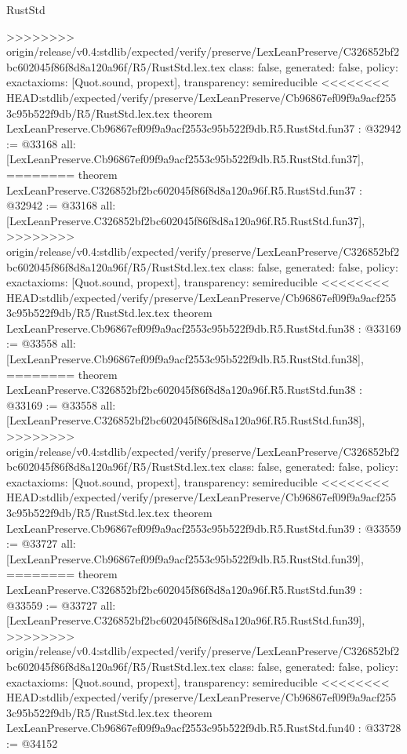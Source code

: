 \begin{lexlean}{RustStd}
\begin{coremodule}
{\begin{coremodule}
{{{{{{{{{{{{{{{{{{{{{{{{{{{{{{{{{{{{{{{{>>>>>>>> origin/release/v0.4:stdlib/expected/verify/preserve/LexLeanPreserve/C326852bf2bc602045f86f8d8a120a96f/R5/RustStd.lex.tex
  class: false,
  generated: false,
  policy: exact{axioms: [Quot.sound, propext]},
  transparency: semireducible
}
<<<<<<<< HEAD:stdlib/expected/verify/preserve/LexLeanPreserve/Cb96867ef09f9a9acf2553c95b522f9db/R5/RustStd.lex.tex
theorem LexLeanPreserve.Cb96867ef09f9a9acf2553c95b522f9db.R5.RustStd.fun37 : @32942 := @33168 {
  all: [LexLeanPreserve.Cb96867ef09f9a9acf2553c95b522f9db.R5.RustStd.fun37],
========
theorem LexLeanPreserve.C326852bf2bc602045f86f8d8a120a96f.R5.RustStd.fun37 : @32942 := @33168 {
  all: [LexLeanPreserve.C326852bf2bc602045f86f8d8a120a96f.R5.RustStd.fun37],
>>>>>>>> origin/release/v0.4:stdlib/expected/verify/preserve/LexLeanPreserve/C326852bf2bc602045f86f8d8a120a96f/R5/RustStd.lex.tex
  class: false,
  generated: false,
  policy: exact{axioms: [Quot.sound, propext]},
  transparency: semireducible
}
<<<<<<<< HEAD:stdlib/expected/verify/preserve/LexLeanPreserve/Cb96867ef09f9a9acf2553c95b522f9db/R5/RustStd.lex.tex
theorem LexLeanPreserve.Cb96867ef09f9a9acf2553c95b522f9db.R5.RustStd.fun38 : @33169 := @33558 {
  all: [LexLeanPreserve.Cb96867ef09f9a9acf2553c95b522f9db.R5.RustStd.fun38],
========
theorem LexLeanPreserve.C326852bf2bc602045f86f8d8a120a96f.R5.RustStd.fun38 : @33169 := @33558 {
  all: [LexLeanPreserve.C326852bf2bc602045f86f8d8a120a96f.R5.RustStd.fun38],
>>>>>>>> origin/release/v0.4:stdlib/expected/verify/preserve/LexLeanPreserve/C326852bf2bc602045f86f8d8a120a96f/R5/RustStd.lex.tex
  class: false,
  generated: false,
  policy: exact{axioms: [Quot.sound, propext]},
  transparency: semireducible
}
<<<<<<<< HEAD:stdlib/expected/verify/preserve/LexLeanPreserve/Cb96867ef09f9a9acf2553c95b522f9db/R5/RustStd.lex.tex
theorem LexLeanPreserve.Cb96867ef09f9a9acf2553c95b522f9db.R5.RustStd.fun39 : @33559 := @33727 {
  all: [LexLeanPreserve.Cb96867ef09f9a9acf2553c95b522f9db.R5.RustStd.fun39],
========
theorem LexLeanPreserve.C326852bf2bc602045f86f8d8a120a96f.R5.RustStd.fun39 : @33559 := @33727 {
  all: [LexLeanPreserve.C326852bf2bc602045f86f8d8a120a96f.R5.RustStd.fun39],
>>>>>>>> origin/release/v0.4:stdlib/expected/verify/preserve/LexLeanPreserve/C326852bf2bc602045f86f8d8a120a96f/R5/RustStd.lex.tex
  class: false,
  generated: false,
  policy: exact{axioms: [Quot.sound, propext]},
  transparency: semireducible
}
<<<<<<<< HEAD:stdlib/expected/verify/preserve/LexLeanPreserve/Cb96867ef09f9a9acf2553c95b522f9db/R5/RustStd.lex.tex
theorem LexLeanPreserve.Cb96867ef09f9a9acf2553c95b522f9db.R5.RustStd.fun40 : @33728 := @34152 {
}}}}}}}}}}}}}}}}}}}}}}}}}}}}}}}}}}}}}}}}}}}
\end{coremodule}}
\end{coremodule}
\end{lexlean}
